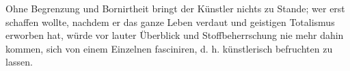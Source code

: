 Ohne Begrenzung und Bornirtheit bringt der Künstler nichts zu Stande; wer erst schaffen wollte, nachdem er das ganze Leben verdaut und geistigen Totalismus erworben hat, würde vor lauter Überblick und Stoffbeherrschung nie mehr dahin kommen, sich von einem Einzelnen fasciniren, d. h. künstlerisch befruchten zu lassen.
\par

